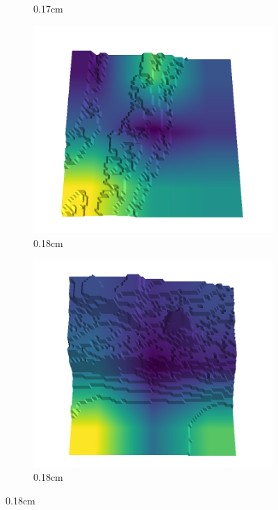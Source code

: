 \documentclass[../document.tex]{subfiles}
\begin{document}
\begin{figure}[H]
\begin{subfigure}[b]{0.192\linewidth}
\caption{0.17cm}
\label{fig : quarry-false_negative-17}
\end{subfigure}
\begin{subfigure}[b]{0.192\linewidth}
\includegraphics[width=\linewidth]{../img/5/quarry/false_negative/17-patch-3d-majavi-colormap-180.png}
\caption{0.18cm}
\label{fig : quarry-false_negative-18}
\end{subfigure}
\begin{subfigure}[b]{0.192\linewidth}
\includegraphics[width=\linewidth]{../img/5/quarry/false_negative/18-patch-3d-majavi-colormap-190.png}
\caption{0.18cm}
\label{fig : quarry-false_negative-19}
\end{subfigure}
\label{fig : quarry-false_negative}
\end{figure}
\end{document}
